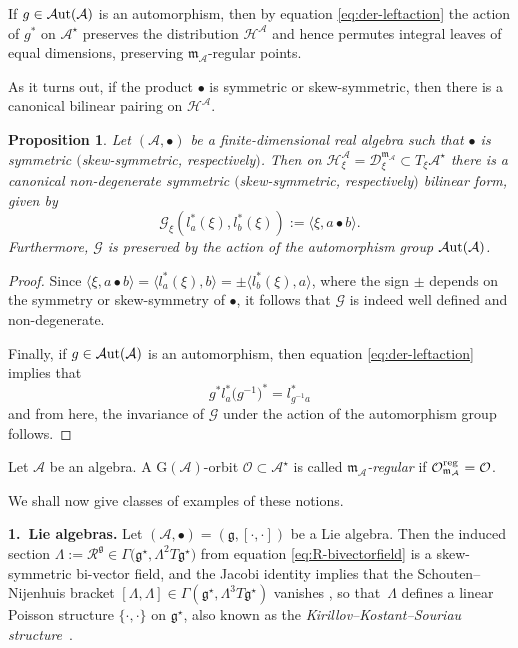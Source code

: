 \documentclass[10pt,a4paper]{amsart}
\numberwithin{equation}{section}
\newtheorem{Proposition}[Theorem]{Proposition}
 { \theoremstyle{definition}
\newtheorem{Definition}[Theorem]{Definition}
\newtheorem{Note}[Theorem]{Note}
\newtheorem{Example}[Theorem]{Example}
\newtheorem{Remark}[Theorem]{Remark} }
\newcommand{\be}{\begin{equation}}
\newcommand{\ee}{\end{equation}}
\newcommand{\hh}{\mathcal{H}}
\newcommand{\Aut}{\mathcal{A}{\rm ut}}
\newcommand{\ocal}{\mathcal{O}}
\newcommand{\dcal}{\mathcal{D}}
\newcommand{\m}{\mathfrak{m}}
\newcommand{\G}{\mathrm{G}}
\newcommand{\g}{{\mathfrak{g}}}
\renewcommand{\m}{{\mathfrak m}}
\newcommand{\cR}{\mathcal{R}}
\newcommand{\cA}{\mathcal{A}}
\newcommand{\Gcal}{\mathcal{G}}
\begin{document}
If $g \in \Aut(\cA)$ is an automorphism, then by equation \eqref{eq:der-leftaction} the action of $g^\ast$ on $\cA^\star$ preserves the distribution $\hh^\cA$ and hence permutes integral leaves of equal dimensions, preserving $\m_\cA$-regular points.

As it turns out, if the product $\bullet$ is symmetric or skew-symmetric, then there is a canonical bilinear pairing on $\hh^\cA$.

\begin{Proposition} \label{prop:inner-product}
Let $(\cA, \bullet)$ be a finite-dimensional real algebra such that $\bullet$ is symmetric $($skew-symmetric, respectively$)$.
Then on $\hh^\cA_\xi = \dcal^{\m_\cA}_\xi \subset T_\xi \cA^\star$ there is a canonical non-degenerate symmetric $($skew-symmetric, respectively$)$ bilinear form, given by
\be \label{eq:inner-productA}
\Gcal_\xi (l_a^\ast(\xi), l_b^\ast(\xi)) := \langle \xi, a \bullet b \rangle.
\ee
Furthermore, $\Gcal$ is preserved by the action of the automorphism group $\Aut(\cA)$.
\end{Proposition}

\begin{proof} Since $\langle \xi, a \bullet b \rangle = \langle l_a^\ast(\xi), b\rangle = \pm \langle l_b^\ast(\xi), a\rangle$, where the sign $\pm$ depends on the symmetry or skew-symmetry of $\bullet$, it follows that $\Gcal$ is indeed well defined and non-degenerate.

Finally, if $g \in \Aut(\cA)$ is an automorphism, then equation \eqref{eq:der-leftaction} implies that
\[
g^\ast l_a^\ast \big(g^{-1}\big)^\ast = l_{g^{-1}a}^\ast
\]
and from here, the invariance of $\Gcal$ under the action of the automorphism group follows.
\end{proof}

\begin{Definition} \label{def:regular-A} Let $\cA$ be an algebra. A $\G(\cA)$-orbit $\ocal \subset \cA^\star$ is called {\em $\m_\cA$-regular } if $\ocal^{\rm reg}_{\m_\cA} = \ocal$.
\end{Definition}

We shall now give classes of examples of these notions.

{\bf 1.\ Lie algebras.}
Let $(\cA, \bullet) = (\g, [\cdot, \cdot])$ be a Lie algebra. Then the induced section $\Lambda := \cR^\g \in \Gamma\big(\g^\star, \Lambda^2 T\g^\star\big)$ from equation \eqref{eq:R-bivectorfield} is a skew-symmetric bi-vector field, and the Jacobi identity implies that the Schouten--Nijenhuis bracket $[\Lambda, \Lambda] \in \Gamma(\g^\star, \Lambda^3 T\g^\star)$ vanishes \cite{Lichnerowicz-1977,Tulczyjew-1974}, so that~$\Lambda$ defines a linear Poisson structure $\{\cdot,\cdot\}$ on $\g^\star$, also known as the {\em Kirillov--Kostant--Souriau structure}~\cite{Kirillov-2004}.
\end{document}
